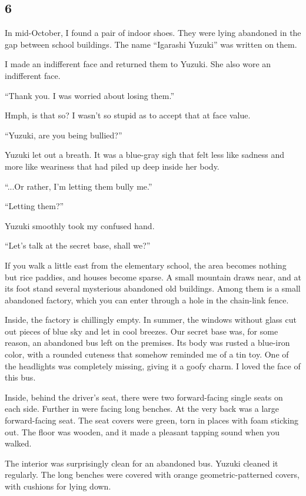 \documentclass[
    a4paper,
    12pt,
    twoside,
    openany,
    UTF8,
    fontset=windows
]{ctexbook}
\begin{document}
\subsection*{6}

In mid-October, I found a pair of indoor shoes. They were lying abandoned in the gap between school buildings. The name ``Igarashi Yuzuki'' was written on them.

I made an indifferent face and returned them to Yuzuki. She also wore an indifferent face.

``Thank you. I was worried about losing them.''

Hmph, is that so? I wasn't so stupid as to accept that at face value.

``Yuzuki, are you being bullied?''

Yuzuki let out a breath. It was a blue-gray sigh that felt less like sadness and more like weariness that had piled up deep inside her body.

``...Or rather, I'm letting them bully me.''

``Letting them?''

Yuzuki smoothly took my confused hand.

``Let's talk at the secret base, shall we?''

If you walk a little east from the elementary school, the area becomes nothing but rice paddies, and houses become sparse. A small mountain draws near, and at its foot stand several mysterious abandoned old buildings. Among them is a small abandoned factory, which you can enter through a hole in the chain-link fence.

Inside, the factory is chillingly empty. In summer, the windows without glass cut out pieces of blue sky and let in cool breezes. Our secret base was, for some reason, an abandoned bus left on the premises. Its body was rusted a blue-iron color, with a rounded cuteness that somehow reminded me of a tin toy. One of the headlights was completely missing, giving it a goofy charm. I loved the face of this bus.

Inside, behind the driver's seat, there were two forward-facing single seats on each side. Further in were facing long benches. At the very back was a large forward-facing seat. The seat covers were green, torn in places with foam sticking out. The floor was wooden, and it made a pleasant tapping sound when you walked.

The interior was surprisingly clean for an abandoned bus. Yuzuki cleaned it regularly. The long benches were covered with orange geometric-patterned covers, with cushions for lying down.
\end{document}
